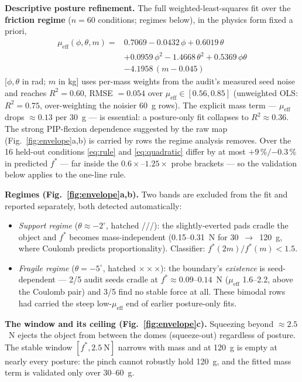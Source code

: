 \documentclass[journal]{IEEEtran}
\newcommand{\mueff}{\mu_{\mathrm{eff}}}
\newcommand{\fstar}{f^{*}}
\begin{document}
\textbf{Descriptive posture refinement.} The full weighted-least-squares
fit over the \textbf{friction regime} ($n = 60$ conditions; regimes below),
in the physics form fixed a priori,
\begin{equation}
\begin{aligned}
  \mueff(\phi,\theta,m) ={}& 0.7069 - 0.0432\,\phi + 0.6019\,\theta \\
  & + 0.0959\,\phi^2 - 1.4668\,\theta^2 + 0.5369\,\phi\theta \\
  & - 4.1958\,(m - 0.045)
  \label{eq:quadratic}
\end{aligned}
\end{equation}
[$\phi,\theta$ in rad; $m$ in kg] uses per-mass weights from the audit's
measured seed noise and reaches $R^2 = 0.60$, RMSE $= 0.054$ over
$\mueff \in [0.56, 0.85]$ (unweighted OLS: $R^2 = 0.75$, over-weighting the
noisier 60~g rows). The explicit mass term --- $\mueff$ drops
${\approx}0.13$ per 30~g --- is essential: a posture-only fit collapses to
$R^2 \approx 0.36$. The strong PIP-flexion dependence suggested by the raw
map (Fig.~\ref{fig:envelope}a,b) is carried by rows the regime analysis
removes. Over the 16 held-out conditions \eqref{eq:rule} and
\eqref{eq:quadratic} differ by at most $+9\,\%/{-0.3}\,\%$ in predicted
$\fstar$ --- far inside the $0.6\times$--$1.25\times$ probe brackets --- so
the validation below applies to the one-line rule.

\textbf{Regimes (Fig.~\ref{fig:envelope}a,b).} Two bands are excluded from
the fit and reported separately, both detected automatically:
\begin{itemize}
  \item \emph{Support regime} ($\theta \approx -2^\circ$, hatched ///):
    the slightly-everted pads cradle the object and $\fstar$ becomes
    mass-independent (0.15--0.31~N for 30~$\to$~120~g, where Coulomb
    predicts proportionality). Classifier:
    $\fstar(2m)/\fstar(m) < 1.5$.
  \item \emph{Fragile regime} ($\theta = -5^\circ$, hatched
    $\times\times\times$): the boundary's \emph{existence} is
    seed-dependent --- 2/5 audit seeds cradle at
    $\fstar \approx 0.09$--$0.14$~N ($\mueff$ 1.6--2.2, above the Coulomb
    pair) and 3/5 find no stable force at all. These bimodal rows had
    carried the steep low-$\mueff$ end of earlier posture-only fits.
\end{itemize}

\textbf{The window and its ceiling (Fig.~\ref{fig:envelope}c).} Squeezing
beyond ${\approx}2.5$~N ejects the object from between the domes
(squeeze-out) regardless of posture. The stable window
$[\fstar, 2.5~\mathrm{N}]$ narrows with mass and at 120~g is empty at
nearly every posture: the pinch cannot robustly hold 120~g, and the fitted
mass term is validated only over 30--60~g.
\end{document}
